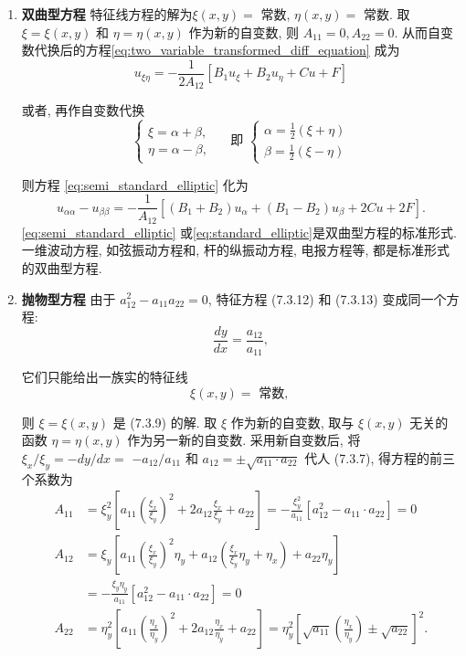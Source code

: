 \begin{enumerate}
    \item \textbf{双曲型方程}
特征线方程的解为$\xi(x, y)=$ 常数, $\eta(x, y)=$ 常数.
取 $\xi=\xi(x, y)$ 和 $\eta=\eta(x, y)$ 作为新的自变数, 则 $A_{11}=0, A_{22}=0$. 从而自变数代换后的方程\eqref{eq:two_variable_transformed_diff_equation} 成为
\begin{equation}
    u_{\xi \eta}=-\frac{1}{2 A_{12}}\left[B_1 u_{\xi}+B_2 u_\eta+C u+F\right]
    \label{eq:semi_standard_elliptic}
\end{equation}

或者, 再作自变数代换
$$
\left\{\begin{array} { l } 
{ \xi = \alpha + \beta , } \\
{ \eta = \alpha - \beta , }
\end{array} \quad \text { 即 } \left\{\begin{array}{l}
\alpha=\frac{1}{2}(\xi+\eta) \\
\beta=\frac{1}{2}(\xi-\eta)
\end{array}\right.\right.
$$

则方程 \eqref{eq:semi_standard_elliptic} 化为
\begin{equation}
    u_{\alpha \alpha}-u_{\beta \beta}=-\frac{1}{A_{12}}\left[\left(B_1+B_2\right) u_\alpha+\left(B_1-B_2\right) u_\beta+2 C u+2 F\right] .
    \label{eq:standard_elliptic}
\end{equation}
\eqref{eq:semi_standard_elliptic} 或\eqref{eq:standard_elliptic}是双曲型方程的标准形式. 
一维波动方程, 如弦振动方程和, 杆的纵振动方程, 电报方程等, 都是标准形式的双曲型方程.


\item \textbf{抛物型方程}
由于 $a_{12}^2-a_{11} a_{22}=0$, 特征方程 (7.3.12) 和 (7.3.13) 变成同一个方程:
$$
\frac{d y}{d x}=\frac{a_{12}}{a_{11}},
$$

它们只能给出一族实的特征线
$$
\xi(x, y)=\text { 常数, }
$$

则 $\xi=\xi(x, y)$ 是 (7.3.9) 的解. 取 $\xi$ 作为新的自变数, 取与 $\xi(x, y)$ 无关的函数 $\eta=\eta(x, y)$ 作为另一新的自变数. 采用新自变数后, 将 $\xi_x / \xi_y=-d y / d x=$ $-a_{12} / a_{11}$ 和 $a_{12}= \pm \sqrt{a_{11} \cdot a_{22}}$ 代人 (7.3.7), 得方程的前三个系数为
$$
\begin{aligned}
A_{11} & =\xi_y^2\left[a_{11}\left(\frac{\xi_x}{\xi_y}\right)^2+2 a_{12} \frac{\xi_x}{\xi_y}+a_{22}\right]=-\frac{\xi_y^2}{a_{11}}\left[a_{12}^2-a_{11} \cdot a_{22}\right]=0 \\
A_{12} & =\xi_y\left[a_{11}\left(\frac{\xi_x}{\xi_y}\right)^2 \eta_y+a_{12}\left(\frac{\xi_x}{\xi_y} \eta_y+\eta_x\right)+a_{22} \eta_y\right] \\
& =-\frac{\xi_y \eta_y}{a_{11}}\left[a_{12}^2-a_{11} \cdot a_{22}\right]=0 \\
A_{22} & =\eta_y^2\left[a_{11}\left(\frac{\eta_x}{\eta_y}\right)^2+2 a_{12} \frac{\eta_x}{\eta_y}+a_{22}\right]=\eta_y^2\left[\sqrt{a_{11}}\left(\frac{\eta_x}{\eta_y}\right) \pm \sqrt{a_{22}}\right]^2 .
\end{aligned}
$$


\end{enumerate}
